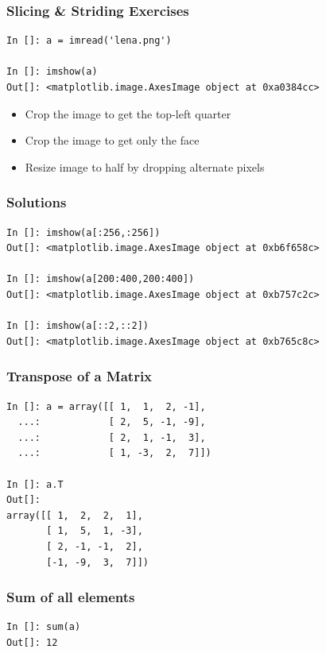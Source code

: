 \documentclass[14pt,compress]{beamer}
\begin{document}
\begin{frame}[fragile]
  \frametitle{Slicing \& Striding Exercises}
\begin{small}
  \begin{lstlisting}
In []: a = imread('lena.png')

In []: imshow(a)
Out[]: <matplotlib.image.AxesImage object at 0xa0384cc>

  \end{lstlisting}
\end{small}
  \begin{itemize}
  \item Crop the image to get the top-left quarter
  \item Crop the image to get only the face
  \item Resize image to half by dropping alternate pixels
  \end{itemize}
\end{frame}

\begin{frame}[fragile]
  \frametitle{Solutions}
\begin{small}
  \begin{lstlisting}
In []: imshow(a[:256,:256])
Out[]: <matplotlib.image.AxesImage object at 0xb6f658c>

In []: imshow(a[200:400,200:400])
Out[]: <matplotlib.image.AxesImage object at 0xb757c2c>

In []: imshow(a[::2,::2])
Out[]: <matplotlib.image.AxesImage object at 0xb765c8c>
  \end{lstlisting}
\end{small}
\end{frame}

\begin{frame}[fragile]
\frametitle{Transpose of a Matrix}
\begin{lstlisting}
In []: a = array([[ 1,  1,  2, -1],
  ...:            [ 2,  5, -1, -9],
  ...:            [ 2,  1, -1,  3],
  ...:            [ 1, -3,  2,  7]])

In []: a.T
Out[]:
array([[ 1,  2,  2,  1],
       [ 1,  5,  1, -3],
       [ 2, -1, -1,  2],
       [-1, -9,  3,  7]])
\end{lstlisting}
\end{frame}

\begin{frame}[fragile]
  \frametitle{Sum of all elements}
  \begin{lstlisting}
In []: sum(a)
Out[]: 12
  \end{lstlisting}
\end{frame}
\end{document}
